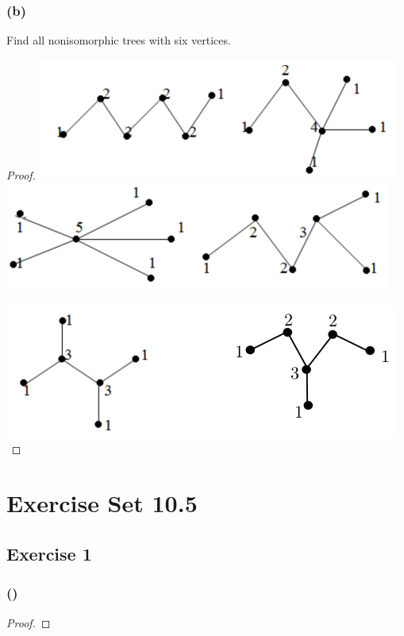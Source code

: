\documentclass[14pt]{extarticle}
\begin{document}
\subsubsection{(b)}
Find all nonisomorphic trees with six vertices.
\begin{proof}
\includegraphics[scale=0.5]{../images/10.4.31.b.1.png}
\includegraphics[scale=0.5]{../images/10.4.31.b.2.png}

\includegraphics[scale=0.5]{../images/10.4.31.b.3.png}
\end{proof}

\section{Exercise Set 10.5}
\subsection{Exercise 1}

\subsubsection{()}

\begin{proof}

\end{proof}
\end{document}
